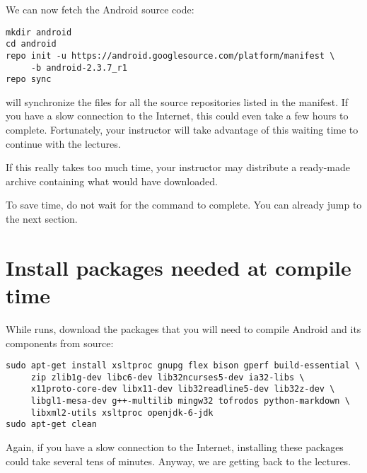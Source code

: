 We can now fetch the Android source code:

\begin{verbatim}
mkdir android
cd android
repo init -u https://android.googlesource.com/platform/manifest \
     -b android-2.3.7_r1
repo sync
\end{verbatim}

 will synchronize the files for all the source repositories listed
in the manifest. If you have a slow connection to the Internet, this could even
take a few hours to complete. Fortunately, your instructor will take advantage
of this waiting time to continue with the lectures.

If this really takes too much time, your instructor may distribute a ready-made archive
containing what \code{repo sync} would have downloaded. 

To save time, do not wait for the  command to complete. You can
already jump to the next section.

\section{Install packages needed at compile time}

While  runs, download the packages that you will need to 
compile Android and its components from source:  

\begin{verbatim}
sudo apt-get install xsltproc gnupg flex bison gperf build-essential \
     zip zlib1g-dev libc6-dev lib32ncurses5-dev ia32-libs \
     x11proto-core-dev libx11-dev lib32readline5-dev lib32z-dev \
     libgl1-mesa-dev g++-multilib mingw32 tofrodos python-markdown \
     libxml2-utils xsltproc openjdk-6-jdk
sudo apt-get clean
\end{verbatim}

Again, if you have a slow connection to the Internet, installing these packages
could take several tens of minutes. Anyway, we are getting back to the lectures.
